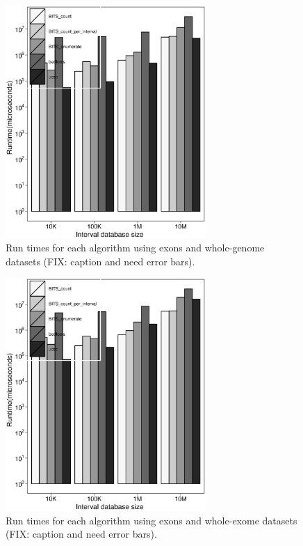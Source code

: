 \documentclass{bioinfo}
\begin{document}
	\begin{figure}[h]
		\centering
		\includegraphics[width=3in]{figures/exons-v-genome.eps}
		\caption[]{Run times for each algorithm using exons and whole-genome datasets (FIX: caption and need error bars).}
	\end{figure}
	
	
	\begin{figure}[h]
		\centering
		\includegraphics[width=3in]{figures/exons-v-exome.eps}
		\caption[]{Run times for each algorithm using exons and whole-exome datasets (FIX: caption and need error bars).}
	\end{figure}
	
\end{document}
